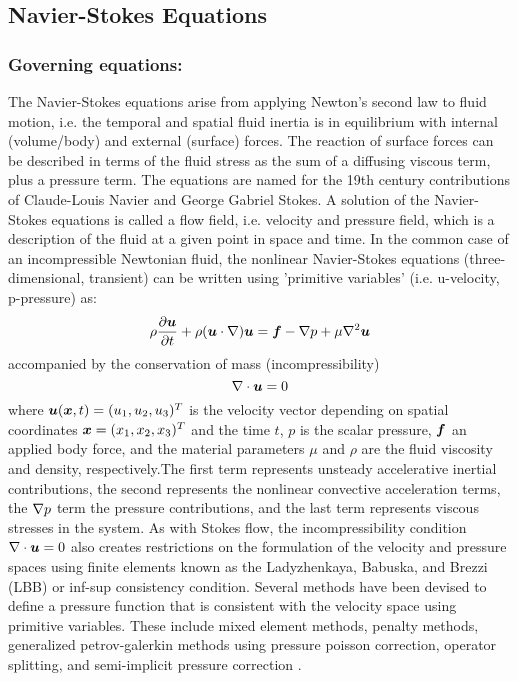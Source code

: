 \subsection{Navier-Stokes Equations} 

\subsubsection{Governing equations:}

The Navier-Stokes equations arise from applying Newton's second law to fluid motion, i.e. the temporal and spatial fluid inertia is in equilibrium with internal (volume/body)  and external (surface) forces. The reaction of surface forces can be described in terms of the fluid stress as the sum of a diffusing viscous term, plus a pressure term. The equations are named for the 19th century contributions of Claude-Louis Navier and George Gabriel Stokes. A solution of the Navier-Stokes equations is called a flow field, i.e. velocity and pressure field, which is a description of the fluid at a given point in space and time.  In the common case of an incompressible Newtonian fluid, the nonlinear Navier-Stokes equations (three-dimensional, transient) can be written using 'primitive variables' (i.e. u-velocity, p-pressure) as:
\begin{equation}
  \label{eqn:NSE}
    \rho\delby{\vect{u}}{t}+\rho(\vect{u}\cdot\grad)\vect{u}=\vect{f}-\grad{p}+\mu\laplacian{\vect{u}}
\end{equation}
accompanied by the conservation of mass (incompressibility)
\begin{equation}
  \label{eqn:NSEIncompressibility}
  \diverg{\vect{u}}=0
\end{equation}
where $\vect{u}(\vect{x},t)=(u_1,u_2,u_3)^T$ is the velocity vector depending on spatial coordinates $\vect{x}=(x_1,x_2,x_3)^T$ and the time $t$, $p$ is the scalar pressure, $\vect{f}$ an applied body force, and the material parameters $\mu$ and $\rho$ are the fluid viscosity and density, respectively.The first term represents unsteady accelerative inertial contributions, the second represents the nonlinear convective acceleration terms, the $\nabla{p}$ term the pressure contributions, and the last term represents viscous stresses in the system.
As with Stokes flow, the incompressibility condition $\diverg{\vect{u}}=0$ also creates restrictions on the formulation of the velocity and pressure spaces using finite elements known as the Ladyzhenkaya, Babuska, and Brezzi (LBB) or inf-sup consistency condition. Several methods have been devised to define a pressure function that is consistent with the velocity space using primitive variables. These include mixed element methods, penalty methods, generalized petrov-galerkin methods using pressure poisson correction, operator splitting, and semi-implicit pressure correction \cite{chung:2010}.

